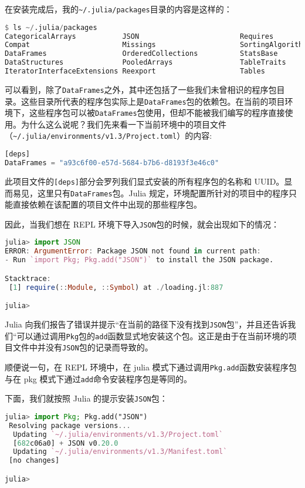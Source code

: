 在安装完成后，我的\verb`~/.julia/packages`目录的内容是这样的：

\begin{lstlisting}[language=julia]
$ ls ~/.julia/packages
CategoricalArrays           JSON                        Requires
Compat                      Missings                    SortingAlgorithms
DataFrames                  OrderedCollections          StatsBase
DataStructures              PooledArrays                TableTraits
IteratorInterfaceExtensions Reexport                    Tables
\end{lstlisting}

可以看到，除了\verb`DataFrames`之外，其中还包括了一些我们未曾相识的程序包目录。这些目录所代表的程序包实际上是\verb`DataFrames`包的依赖包。在当前的项目环境下，这些程序包可以被\verb`DataFrames`包使用，但却不能被我们编写的程序直接使用。为什么这么说呢？我们先来看一下当前环境中的项目文件（\verb`~/.julia/environments/v1.3/Project.toml`）的内容:

\begin{lstlisting}[language=julia]
[deps]
DataFrames = "a93c6f00-e57d-5684-b7b6-d8193f3e46c0"
\end{lstlisting}

此项目文件的\verb`[deps]`部分会罗列我们显式安装的所有程序包的名称和 UUID。显而易见，这里只有\verb`DataFrames`包。Julia 规定，环境配置所针对的项目中的程序只能直接依赖在该配置的项目文件中出现的那些程序包。

因此，当我们想在 REPL 环境下导入\verb`JSON`包的时候，就会出现如下的情况：

\begin{lstlisting}[language=julia]
julia> import JSON
ERROR: ArgumentError: Package JSON not found in current path:
- Run `import Pkg; Pkg.add("JSON")` to install the JSON package.

Stacktrace:
 [1] require(::Module, ::Symbol) at ./loading.jl:887

julia> 
\end{lstlisting}

Julia 向我们报告了错误并提示“在当前的路径下没有找到\verb`JSON`包”，并且还告诉我们“可以通过调用\verb`Pkg`包的\verb`add`函数显式地安装这个包。这正是由于在当前环境的项目文件中并没有\verb`JSON`包的记录而导致的。

顺便说一句，在 REPL 环境中，在 julia 模式下通过调用\verb`Pkg.add`函数安装程序包与在 pkg 模式下通过\verb`add`命令安装程序包是等同的。

下面，我们就按照 Julia 的提示安装\verb`JSON`包：

\begin{lstlisting}[language=julia]
julia> import Pkg; Pkg.add("JSON")
 Resolving package versions...
  Updating `~/.julia/environments/v1.3/Project.toml`
  [682c06a0] + JSON v0.20.0
  Updating `~/.julia/environments/v1.3/Manifest.toml`
 [no changes]

julia> 
\end{lstlisting}

